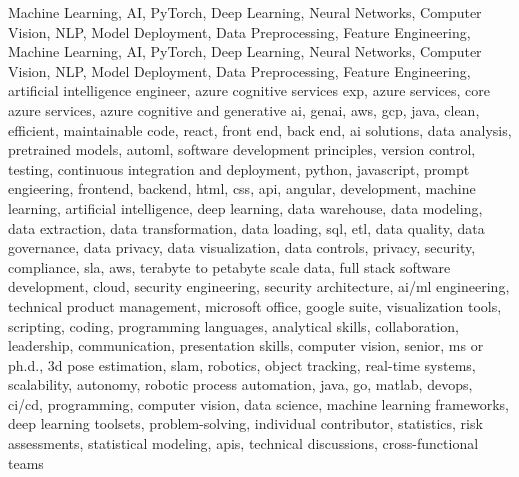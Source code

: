 \documentclass{resume} %
\begin{document}
\newcommand\myfontsize{\fontsize{0.1pt}{0.1pt}\selectfont} \myfontsize \color{white}
Machine Learning, AI, PyTorch, Deep Learning, Neural Networks, Computer Vision, NLP, Model Deployment, Data Preprocessing, Feature Engineering, Machine Learning, AI, PyTorch, Deep Learning, Neural Networks, Computer Vision, NLP, Model Deployment, Data Preprocessing, Feature Engineering, {artificial intelligence engineer, azure cognitive services exp, azure services, core azure services, azure cognitive and generative ai, genai, aws,  gcp, java, clean, efficient, maintainable code, react, front end, back end, ai solutions, data analysis, pretrained models, automl, software development principles, version control, testing, continuous integration and deployment, python, javascript, prompt engieering, frontend, backend, html, css, api, angular, development, machine learning, artificial intelligence, deep learning, data warehouse, data modeling, data extraction, data transformation, data loading, sql, etl, data quality, data governance, data privacy, data visualization, data controls, privacy, security, compliance, sla, aws, terabyte to petabyte scale data, full stack software development, cloud, security engineering, security architecture, ai/ml engineering, technical product management, microsoft office, google suite, visualization tools, scripting, coding, programming languages, analytical skills, collaboration, leadership, communication, presentation skills, computer vision, senior, ms or ph.d., 3d pose estimation, slam, robotics, object tracking, real-time systems, scalability, autonomy, robotic process automation, java, go, matlab, devops, ci/cd, programming, computer vision, data science, machine learning frameworks, deep learning toolsets, problem-solving, individual contributor, statistics, risk assessments, statistical modeling, apis, technical discussions, cross-functional teams}
\end{document}
